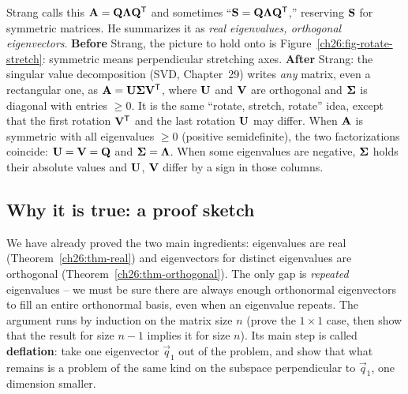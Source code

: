 \begin{strangbox}
Strang calls this $\mathbf{A} = \mathbf{Q}\mathbf{\Lambda}\mathbf{Q}^{\mathsf{T}}$ and sometimes
``$\mathbf{S} = \mathbf{Q}\mathbf{\Lambda}\mathbf{Q}^{\mathsf{T}}$,'' reserving $\mathbf{S}$ for symmetric
matrices. He summarizes it as \emph{real eigenvalues, orthogonal
eigenvectors}. \textbf{Before} Strang, the picture to hold onto is
Figure~\ref{ch26:fig-rotate-stretch}: symmetric means perpendicular stretching
axes. \textbf{After} Strang: the singular value decomposition (SVD, Chapter~29)
writes \emph{any} matrix, even a rectangular one, as
$\mathbf{A}=\mathbf{U}\mathbf{\Sigma}\mathbf{V}^{\mathsf{T}}$, where $\mathbf{U}$ and $\mathbf{V}$ are
orthogonal and $\mathbf{\Sigma}$ is diagonal with entries $\ge 0$. It is the same
``rotate, stretch, rotate'' idea, except that the first rotation $\mathbf{V}^{\mathsf{T}}$ and the
last rotation $\mathbf{U}$ may differ. When $\mathbf{A}$ is symmetric with all
eigenvalues $\ge 0$ (positive semidefinite), the two factorizations coincide:
$\mathbf{U}=\mathbf{V}=\mathbf{Q}$ and $\mathbf{\Sigma}=\mathbf{\Lambda}$. When some eigenvalues are
negative, $\mathbf{\Sigma}$ holds their absolute values and $\mathbf{U}$, $\mathbf{V}$
differ by a sign in those columns.
\end{strangbox}

\subsection{Why it is true: a proof sketch}
\label{ch26:proof-sketch}

We have already proved the two main ingredients: eigenvalues are real
(Theorem~\ref{ch26:thm-real}) and eigenvectors for distinct eigenvalues are
orthogonal (Theorem~\ref{ch26:thm-orthogonal}). The only gap is \emph{repeated}
eigenvalues -- we must be sure there are always enough orthonormal eigenvectors to
fill an entire orthonormal basis, even when an eigenvalue repeats. The argument
runs by induction on the matrix size $n$ (prove the $1\times 1$ case, then show
that the result for size $n-1$ implies it for size $n$). Its main step is
called \textbf{deflation}: take one eigenvector $\vec{q}_1$ out of the problem,
and show that what remains is a problem of the same kind on the subspace
perpendicular to $\vec{q}_1$, one dimension smaller.

